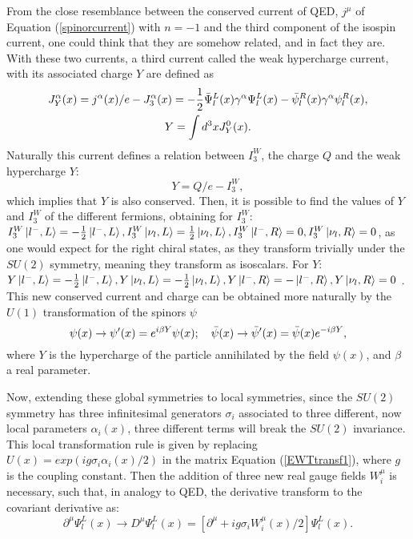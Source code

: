 From the close resemblance between the conserved current of QED, $j^{\mu}$ of Equation (\ref{spinorcurrent}) with $n = -1$ and the third component of the isospin current, one could think that they are somehow related, and in fact they are. With these two currents, a third current called the weak hypercharge current, with its associated charge $Y$ are defined as
\begin{gather*}
    J^{\alpha}_Y(x) = j^{\alpha}(x)/e - J^{\alpha}_3(x) = -\dfrac{1}{2}\bar{\Psi}^L_l(x)\gamma^{\alpha}\Psi^L_l(x) - \Bar{\psi}^R_l(x)\gamma^{\alpha}\psi^R_l(x), \\
    Y = \int d^3x J^0_Y(x).
\end{gather*}
Naturally this current defines a relation between $I^W_3$, the charge $Q$ and the weak hypercharge $Y$:
\begin{equation*}
    Y = Q/e - I^W_3,
\end{equation*}
which implies that $Y$ is also conserved. Then, it is possible to find the values of $Y$ and $I^W_3$ of the different fermions, obtaining for $I^W_3$: $I^W_3\ket{l^-,L} = -\frac{1}{2}\ket{l^-,L}, I^W_3\ket{\nu_l,L} = \frac{1}{2}\ket{\nu_l,L}, I^W_3\ket{l^-,R} = 0, I^W_3\ket{\nu_l,R} = 0$, as one would expect for the right chiral states, as they transform trivially under the $SU(2)$ symmetry, meaning they transform as isoscalars. For $Y$: $Y\ket{l^-,L} = -\frac{1}{2}\ket{l^-,L}, Y\ket{\nu_l,L} = -\frac{1}{2}\ket{\nu_l,L}, Y\ket{l^-,R} = -\ket{l^-,R}, Y\ket{\nu_l,R} = 0$ \cite{Mandl}. This new conserved current and charge can be obtained more naturally by the $U(1)$ transformation of the spinors $\psi$
\begin{equation*}
    \psi(x) \rightarrow \psi'(x) = e^{i\beta Y}\psi(x); \quad \Bar{\psi}(x) \rightarrow \Bar{\psi}'(x) = \Bar{\psi}(x)e^{-i\beta Y},
\end{equation*}
where $Y$ is the hypercharge of the particle annihilated by the field $\psi(x)$, and $\beta$ a real parameter.

Now, extending these global symmetries to local symmetries, since the $SU(2)$ symmetry has three infinitesimal generators $\sigma_i$ associated to three different, now local parameters $\alpha_i(x)$, three different terms will break the $SU(2)$ invariance. This local transformation rule is given by replacing $U(x) = exp(ig\sigma_i\alpha_i(x)/2)$ in the matrix Equation (\ref{EWTtransf1}), where $g$ is the coupling constant. Then the addition of three new real gauge fields $W_i^{\mu}$ is necessary, such that, in analogy to QED, the derivative transform to the covariant derivative as:
\begin{equation}
\label{eqcovderiv1}
    \partial^{\mu}\Psi^L_l(x) \rightarrow D^{\mu}\Psi^L_l(x) = [\partial^{\mu} + ig\sigma_iW_i^{\mu}(x)/2]\Psi^L_l(x).
\end{equation}

